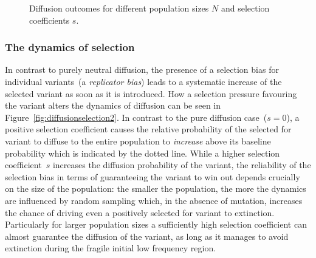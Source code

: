 \begin{knitrout}
\color{fgcolor}\begin{figure}[htbp]

{\centering {}

}

\caption[Diffusion outcomes for different population sizes $N$ and selection coefficients $s$]{Diffusion outcomes for different population sizes $N$ and selection coefficients $s$.}\label{fig:diffusionselection}
\end{figure}


\end{knitrout}

\subsubsection{The dynamics of selection}

In contrast to purely neutral diffusion, the presence of a selection bias for individual variants~(a \emph{replicator bias}) leads to a systematic increase of the selected variant as soon as it is introduced. How a selection pressure favouring the variant alters the dynamics of diffusion can be seen in Figure~\ref{fig:diffusionselection2}. In contrast to the pure diffusion case~($s=0$), a positive selection coefficient causes the relative probability of the selected for variant to diffuse to the entire population to \emph{increase} above its baseline probability which is indicated by the dotted line.
While a higher selection coefficient~$s$ increases the diffusion probability of the variant, the reliability of the selection bias in terms of guaranteeing the variant to win out depends crucially on the size of the population: the smaller the population, the more the dynamics are influenced by random sampling which, in the absence of mutation, increases the chance of driving even a positively selected for variant to extinction. Particularly for larger population sizes a sufficiently high selection coefficient can almost guarantee the diffusion of the variant, as long as it manages to avoid extinction during the fragile initial low frequency region.

